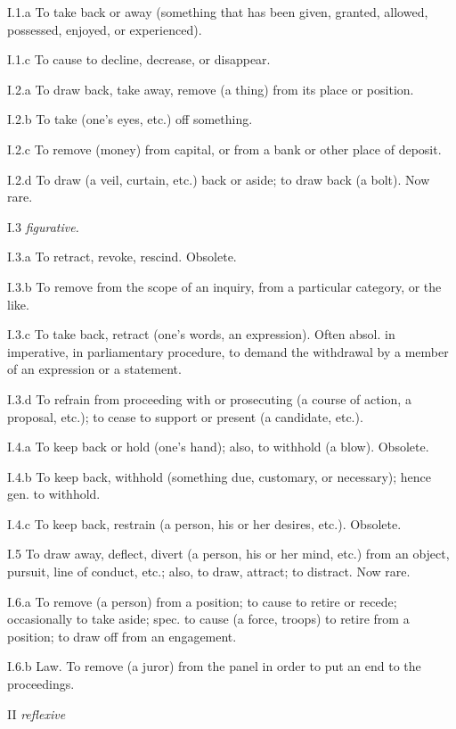 	\begin{compactitem}
		\item[I.1.a] To take back or away (something that has been given, granted, allowed, possessed, enjoyed, or experienced).
		\item[I.1.c] To cause to decline, decrease, or disappear. 
		\item[I.2.a] To draw back, take away, remove (a thing) from its place or position.
		\item[I.2.b] To take (one's eyes, etc.) off something.
		\item[I.2.c] To remove (money) from capital, or from a bank or other place of deposit.
		\item[I.2.d] To draw (a veil, curtain, etc.) back or aside; to draw back (a bolt). Now rare.
		\item[I.3] \textit{figurative.}
		\item[I.3.a] To retract, revoke, rescind. Obsolete.
		\item[I.3.b] To remove from the scope of an inquiry, from a particular category, or the like.
		\item[I.3.c] To take back, retract (one's words, an expression). Often absol. in imperative, in parliamentary procedure, to demand the withdrawal by a member of an expression or a statement.
		\item[I.3.d] To refrain from proceeding with or prosecuting (a course of action, a proposal, etc.); to cease to support or present (a candidate, etc.).
		\item[I.4.a] To keep back or hold (one's hand); also, to withhold (a blow). Obsolete.
		\item[I.4.b] To keep back, withhold (something due, customary, or necessary); hence gen. to withhold.
		\item[I.4.c] To keep back, restrain (a person, his or her desires, etc.). Obsolete.
		\item[I.5] To draw away, deflect, divert (a person, his or her mind, etc.) from an object, pursuit, line of conduct, etc.; also, to draw, attract; to distract. Now rare.
		\item[I.6.a] To remove (a person) from a position; to cause to retire or recede; occasionally to take aside; spec. to cause (a force, troops) to retire from a position; to draw off from an engagement.
		\item[I.6.b] Law. To remove (a juror) from the panel in order to put an end to the proceedings.
		\item[II] \textit{reflexive}

\end{compactitem}
